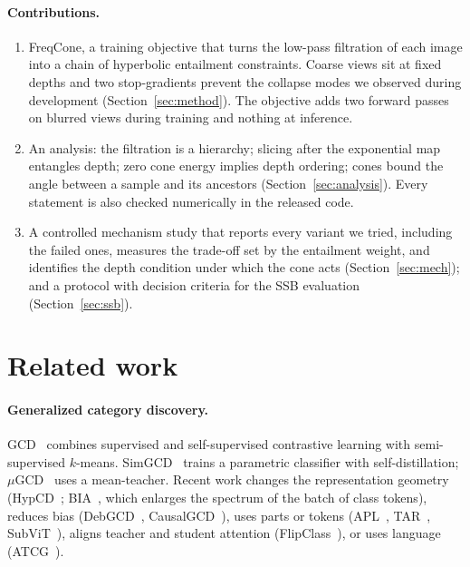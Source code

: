 \documentclass[10pt]{article}
\begin{document}
\paragraph{Contributions.}
\begin{enumerate}
\item FreqCone, a training objective that turns the low-pass filtration of each image into a chain of
hyperbolic entailment constraints. Coarse views sit at fixed depths and two stop-gradients prevent the
collapse modes we observed during development (Section~\ref{sec:method}). The objective adds two forward
passes on blurred views during training and nothing at inference.
\item An analysis: the filtration is a hierarchy; slicing after the exponential map entangles depth; zero cone
energy implies depth ordering; cones bound the angle between a sample and its ancestors
(Section~\ref{sec:analysis}). Every statement is also checked numerically in the released code.
\item A controlled mechanism study that reports every variant we tried, including the failed ones, measures
the trade-off set by the entailment weight, and identifies the depth condition under which the cone acts
(Section~\ref{sec:mech}); and a protocol with decision criteria for the SSB evaluation (Section~\ref{sec:ssb}).
\end{enumerate}

\section{Related work}
\paragraph{Generalized category discovery.} GCD~\cite{vaze2022gcd} combines supervised and self-supervised
contrastive learning with semi-supervised $k$-means. SimGCD~\cite{wen2023simgcd} trains a parametric
classifier with self-distillation; $\mu$GCD~\cite{vaze2023mugcd} uses a mean-teacher. Recent work changes the
representation geometry (HypCD~\cite{liu2025hypcd}; BIA~\cite{bia2026}, which enlarges the spectrum of the batch
of class tokens), reduces bias (DebGCD~\cite{liu2025debgcd}, CausalGCD~\cite{causalgcd2026}), uses parts or
tokens (APL~\cite{apl2025}, TAR~\cite{tar2026}, SubViT~\cite{subvit2026}), aligns teacher and student attention
(FlipClass~\cite{flipclass2024}), or uses language (ATCG~\cite{atcg2026}).
\end{document}
